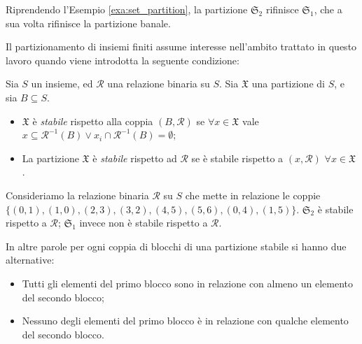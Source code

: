 \begin{example}
    Riprendendo l'Esempio \ref*{exa:set_partition}, la partizione $\mathfrak{S}_2$ rifinisce $\mathfrak{S}_1$, che a sua volta rifinisce la partizione banale.
\end{example}

Il partizionamento di insiemi finiti assume interesse nell'ambito trattato in questo lavoro quando viene introdotta la seguente condizione:
\begin{definition}
    Sia $S$ un insieme, ed $\mathcal{R}$ una relazione binaria su $S$. Sia $\mathfrak{X}$ una partizione di $S$, e sia $B \subseteq S$.
    \begin{itemize}
        \item $\mathfrak{X}$ è \emph{stabile} rispetto alla coppia $(B,\mathcal{R})$ se $\forall x \in \mathfrak{X}$ vale $x \subseteq \mathcal{R}^{-1}(B) \lor x_i \cap \mathcal{R}^{-1}(B) = \emptyset$;
        \item La partizione $\mathfrak{X}$ è \emph{stabile} rispetto ad $\mathcal{R}$ se è stabile rispetto a $(x,\mathcal{R}) \,\,\forall x \in \mathfrak{X}$.
    \end{itemize}
\end{definition}

\begin{example}
    \label{exa:set_partition_stable}
    Consideriamo la relazione binaria $\mathcal{R}$ su $S$ che mette in relazione le coppie $\{(0,1),(1,0),(2,3),(3,2),(4,5),(5,6),(0,4),(1,5)\}$. $\mathfrak{S}_2$ è stabile rispetto a $\mathcal{R}$; $\mathfrak{S}_1$ invece non è stabile rispetto a $\mathcal{R}$.
\end{example}

In altre parole per ogni coppia di blocchi di una partizione stabile si hanno due alternative:
\begin{itemize}
    \item Tutti gli elementi del primo blocco sono in relazione con almeno un elemento del secondo blocco;
    \item Nessuno degli elementi del primo blocco è in relazione con qualche elemento del secondo blocco.
\end{itemize}


